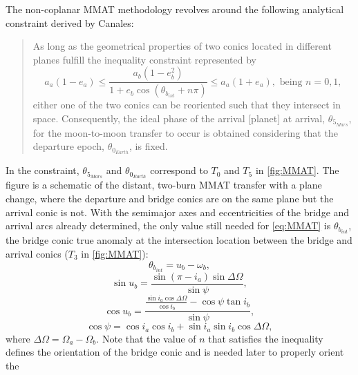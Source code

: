 The non-coplanar MMAT methodology revolves around the following analytical constraint derived by
Canales\cite{Canales:2021b}:
\begin{quote}
    As long as the geometrical properties of two conics located in different planes fulfill the
    inequality constraint represented by
    \begin{equation}
        a_{a}(1-e_{a})\leq\frac{a_{b}(1-e_{b}^{2})}{1+e_{b}\cos(\theta_{b_{int}}+n\pi)}\leq a_{a}(1+e_{a}),\text{ being }n=0,1,
        \label{eq:MMAT}
    \end{equation}
    either one of the two conics can be reoriented such that they intersect in space. Consequently,
    the ideal phase of the arrival [planet] at arrival, $\theta_{5_{Mars}}$, for the moon-to-moon
    transfer to occur is obtained considering that the departure epoch, $\theta_{0_{Earth}}$, is
    fixed.
\end{quote}
In the constraint, $\theta_{5_{Mars}}$ and $\theta_{0_{Earth}}$ correspond to $T_{0}$ and $T_{5}$
in \cref{fig:MMAT}. The figure is a schematic of the distant, two-burn MMAT transfer with a plane
change, where the departure and bridge conics are on the same plane but the arrival conic is not.
With the semimajor axes and eccentricities of the bridge and arrival arcs already determined, the
only value still needed for \cref{eq:MMAT} is $\theta_{b_{int}}$, the bridge conic true anomaly at
the intersection location between the bridge and arrival conics ($T_{3}$ in \cref{fig:MMAT}):
\begin{equation}
    \theta_{b_{int}}=u_{b}-\omega_{b},
    \label{eq:bridgeintersect}
\end{equation}
\vspace{1mm}
\begin{equation}
    \sin u_{b}=\frac{\sin(\pi-i_{a})\sin\Delta\Omega}{\sin\psi},
    \label{eq:bridgesinu}
\end{equation}
\vspace{1mm}
\begin{equation}
    \cos u_{b}=\frac{\frac{\sin i_{a}\cos\Delta\Omega}{\cos i_{b}}-\cos\psi\tan i_{b}}{\sin\psi},
    \label{eq:bridgecosu}
\end{equation}
\vspace{1mm}
\begin{equation}
    \cos\psi=\cos i_{a}\cos i_{b}+\sin i_{a}\sin i_{b}\cos\Delta\Omega,
\end{equation}
where $\Delta\Omega=\Omega_{a}-\Omega_{b}$. Note that the value of $n$ that satisfies the
inequality defines the orientation of the bridge conic and is needed later to properly orient the
